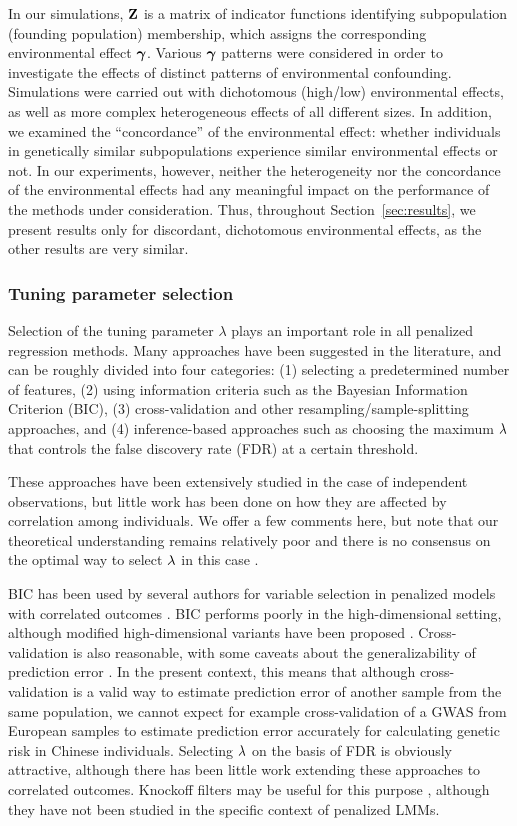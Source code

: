In our simulations, $\mathbf{Z}$ is a matrix of indicator functions identifying subpopulation (founding population) membership, which assigns the corresponding environmental effect $\boldsymbol{\gamma}$. Various $\boldsymbol{\gamma}$ patterns were considered in order to investigate the effects of distinct patterns of environmental confounding.  Simulations were carried out with dichotomous (high/low) environmental effects, as well as more complex heterogeneous effects of all different sizes.  In addition, we examined the ``concordance'' of the environmental effect: whether individuals in genetically similar subpopulations experience similar environmental effects or not.  In our experiments, however, neither the heterogeneity nor the concordance of the environmental effects had any meaningful impact on the performance of the methods under consideration.  Thus, throughout Section~\ref{sec:results}, we present results only for discordant, dichotomous environmental effects, as the other results are very similar.

\subsubsection{Tuning parameter selection}

Selection of the tuning parameter $\lambda$ plays an important role in all penalized regression methods.  Many approaches have been suggested in the literature, and can be roughly divided into four categories: (1) selecting a predetermined number of features, (2) using information criteria such as the Bayesian Information Criterion (BIC), (3) cross-validation and other resampling/sample-splitting approaches, and (4) inference-based approaches such as choosing the maximum $\lambda$ that controls the false discovery rate (FDR) at a certain threshold.

These approaches have been extensively studied in the case of independent observations, but little work has been done on how they are affected by correlation among individuals.  We offer a few comments here, but note that our theoretical understanding remains relatively poor and there is no consensus on the optimal way to select $\lambda$ in this case \citep{wauthier2013comparative}.

BIC has been used by several authors for variable selection in penalized models with correlated outcomes \citep{bondell2010joint, schelldorfer2011estimation}. BIC performs poorly in the high-dimensional setting, although modified high-dimensional variants have been proposed \citep{fan2013tuning,Chen2008a}. Cross-validation is also reasonable, with some caveats about the generalizability of prediction error \citep{Rabinowicz2020}. In the present context, this means that although cross-validation is a valid way to estimate prediction error of another sample from the same population, we cannot expect for example cross-validation of a GWAS from European samples to estimate prediction error accurately for calculating genetic risk in Chinese individuals.  Selecting $\lambda$ on the basis of FDR is obviously attractive, although there has been little work extending these approaches to correlated outcomes.  Knockoff filters may be useful for this purpose \citep{Sesia2018}, although they have not been studied in the specific context of penalized LMMs.

